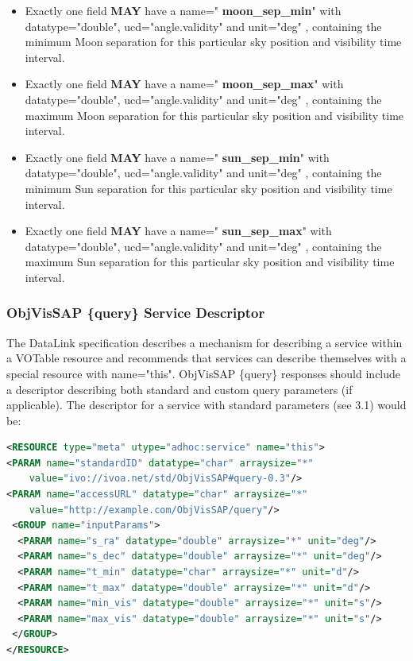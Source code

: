 \documentclass[11pt,a4paper]{ivoa}
\begin{document}
\begin{itemize}
\item Exactly one field \textbf{MAY }have a name="\textbf{
moon\_sep\_min}" with datatype="double", ucd="angle.validity" and
unit="deg" , containing the minimum Moon separation for this particular
sky position and visibility time interval.
\end{itemize}


\begin{itemize}
\item Exactly one field \textbf{MAY }have a name="\textbf{
moon\_sep\_max}" with datatype="double", ucd="angle.validity" and
unit="deg" , containing the maximum Moon separation for this particular
sky position and visibility time interval.
\end{itemize}


\begin{itemize}
\item Exactly one field \textbf{MAY }have a name="\textbf{
sun\_sep\_min}" with datatype="double", ucd="angle.validity" and
unit="deg" , containing the minimum Sun separation for this particular
sky position and visibility time interval.
\end{itemize}


\begin{itemize}
\item Exactly one field \textbf{MAY }have a name="\textbf{
sun\_sep\_max}" with datatype="double", ucd="angle.validity" and
unit="deg" , containing the maximum Sun separation for this particular
sky position and visibility time interval.
\end{itemize}
\subsubsection{ObjVisSAP \{query\} Service Descriptor}
The DataLink specification describes a mechanism for describing a
service within a VOTable resource and recommends that services can
describe themselves with a special resource with name="this". ObjVisSAP
\{query\} responses should include a descriptor describing both standard
and custom query parameters (if applicable). The descriptor for a
service with standard parameters (see 3.1) would be:\\

\begin{lstlisting}[language=XML]
<RESOURCE type="meta" utype="adhoc:service" name="this">
<PARAM name="standardID" datatype="char" arraysize="*"
    value="ivo://ivoa.net/std/ObjVisSAP#query-0.3"/>
<PARAM name="accessURL" datatype="char" arraysize="*"
    value="http://example.com/ObjVisSAP/query"/>
 <GROUP name="inputParams">
  <PARAM name="s_ra" datatype="double" arraysize="*" unit="deg"/>
  <PARAM name="s_dec" datatype="double" arraysize="*" unit="deg"/>
  <PARAM name="t_min" datatype="char" arraysize="*"	unit="d"/>
  <PARAM name="t_max" datatype="double" arraysize="*" unit="d"/>
  <PARAM name="min_vis" datatype="double" arraysize="*"	unit="s"/>
  <PARAM name="max_vis"	datatype="double" arraysize="*"	unit="s"/>
 </GROUP>
</RESOURCE>
\end{lstlisting}
\end{document}
